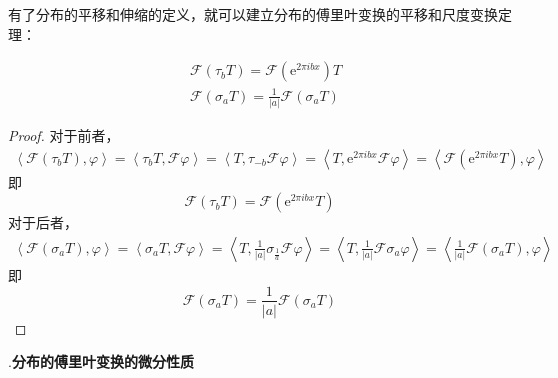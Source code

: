 有了分布的平移和伸缩的定义，就可以建立分布的傅里叶变换的平移和尺度变换定理：
\begin{theorem}[分布的傅里叶变换的平移和尺度变换]
\begin{align*}
    &\mathcal{F}(\tau_b T)=\mathcal{F}(\mathrm{e}^{2\pi ibx})T\\
    &\mathcal{F}(\sigma_a T)=\frac{1}{|a|}\mathcal{F}(\sigma_a T)
\end{align*}
\end{theorem}
\begin{proof}
    对于前者，
        \begin{align*}
    \left\langle\mathcal{F}(\tau_b T),\varphi\right\rangle =\left\langle \tau_b T,\mathcal{F}\varphi\right\rangle=\left\langle T,\tau_{-b}\mathcal{F}\varphi\right\rangle=\left\langle T,\mathrm{e}^{2\pi ibx}\mathcal{F}\varphi\right\rangle=\left\langle \mathcal{F}(\mathrm{e}^{2\pi ibx}T),\varphi\right\rangle
\end{align*}
即\[\mathcal{F}(\tau_b T)=\mathcal{F}(\mathrm{e}^{2\pi ibx}T)\]
对于后者，
\begin{align*}
    \left\langle\mathcal{F}(\sigma_a T),\varphi\right\rangle =\left\langle \sigma_a T,\mathcal{F}\varphi\right\rangle=\left\langle T,\frac{1}{|a|}\sigma_{\frac{1}{a}}\mathcal{F}\varphi\right\rangle=\left\langle T,\frac{1}{|a|}\mathcal{F}\sigma_a \varphi\right\rangle=\left\langle \frac{1}{|a|}\mathcal{F}(\sigma_a T),\varphi\right\rangle
\end{align*}
即\[\mathcal{F}(\sigma_a T)=\frac{1}{|a|}\mathcal{F}(\sigma_a T)\]
\end{proof}

.\textbf{分布的傅里叶变换的微分性质}

